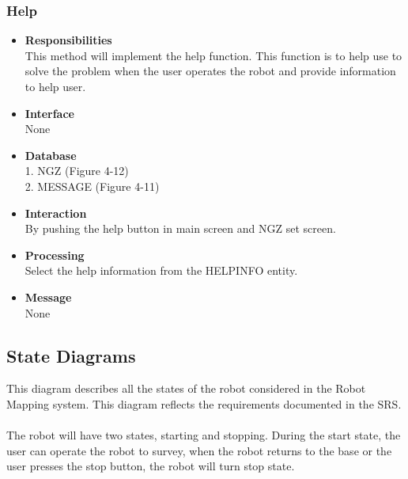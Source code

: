 \documentclass[11pt, a4paper]{article}
\begin{document}
\subsubsection{Help}
\begin{itemize}
\item {\bfseries Responsibilities }\\
This method will implement the help function. This function is to help use to solve the problem when the user operates the robot and provide information to help user.\\

\item {\bfseries Interface }\\
None

\item {\bfseries Database }\\
1. NGZ (Figure 4-12)\\
2. MESSAGE (Figure 4-11)\\

\item {\bfseries Interaction }\\
By pushing the help button in main screen and NGZ set screen.\\

\item {\bfseries Processing }\\
Select the help information from the HELPINFO entity. 

\item {\bfseries Message }\\
None
\end{itemize}

\subsection{State Diagrams}
This diagram describes all the states of the robot considered in the Robot Mapping system. This diagram reflects the requirements documented in the SRS. \\
\\
The robot will have two states, starting and stopping. During the start state, the user can operate the robot to survey, when the robot returns to the base or the user presses the stop button, the robot will turn stop state.
\end{document}
